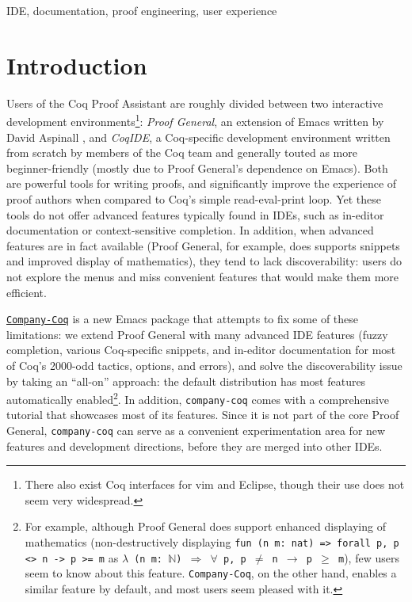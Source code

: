 \documentclass[preprint]{sigplanconf}
\newcommand{\proofg}{Proof General\xspace}
\begin{document}
\keywords IDE, documentation, proof engineering, user experience

\section*{Introduction}

Users of the Coq Proof Assistant \cite{Coq} are roughly divided between two interactive development environments\footnote{There also exist Coq interfaces for vim and Eclipse, though their use does not seem very widespread.}: \emph{\proofg}, an extension of Emacs written by David Aspinall \cite{ProofGeneral}, and \emph{CoqIDE}, a Coq-specific development environment written from scratch by members of the Coq team and generally touted as more beginner-friendly (mostly due to \proofg's dependence on Emacs). Both are powerful tools for writing proofs, and significantly improve the experience of proof authors when compared to Coq's simple read-eval-print loop. Yet these tools do not offer advanced features typically found in IDEs, such as in-editor documentation or context-sensitive completion. In addition, when advanced features are in fact available (\proofg, for example, does supports snippets and improved display of mathematics), they tend to lack discoverability: users do not explore the menus and miss convenient features that would make them more efficient.

\href{https://github.com/cpitclaudel/company-coq/}{\texttt{Company-Coq}} is a new Emacs package that attempts to fix some of these limitations: we extend \proofg with many advanced IDE features (fuzzy completion, various Coq-specific snippets, and in-editor documentation for most of Coq's 2000-odd tactics, options, and errors), and solve the discoverability issue by taking an ``all-on'' approach: the default distribution has most features automatically enabled\footnote{For example, although \proofg does support enhanced displaying of mathematics (non-destructively displaying \texttt{fun (n m: nat) => forall p, p <> n -> p >= m} as \texttt{$\lambda$ (n m: $\mathbb{N}$) $\Rightarrow$ $\forall$ p, p $\neq$ n $\rightarrow$ p $\geq$ m}), few users seem to know about this feature. \texttt{Company-Coq}, on the other hand, enables a similar feature by default, and most users seem pleased with it.}. In addition, \texttt{company-coq} comes with a comprehensive tutorial that showcases most of its features.
Since it is not part of the core \proofg, \texttt{company-coq} can serve as a convenient experimentation area for new features and development directions, before they are merged into other IDEs.%
\end{document}
